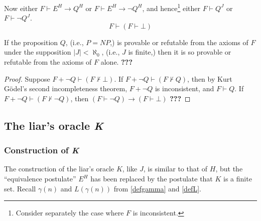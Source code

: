 \documentclass[letterpaper]{article}
\newcommand{\Construction}{{\large\dsmathematical}}
\begin{document}
Now either $F\vdash E^H\longrightarrow Q^H$ or $F\vdash E^H\longrightarrow\lnot Q^H$, and hence\footnote{Consider separately the case where $F$ is inconsistent.} either $F\vdash Q^J$ or $F\vdash\lnot Q^J$.
\begin{equation}
F\vdash(F\vdash\bot)
\end{equation}

\begin{theorem}
	If the proposition $Q$, (i.e., $P=NP$,) is provable or refutable from the axioms of $F$ under the supposition $|J|<\aleph_0$, (i.e., $J$ is finite,) then it is so provable or refutable from the axioms of $F$ alone.	\textbf{\color{red}???}
\end{theorem}
\begin{proof}
Suppose $F+\lnot Q\vdash (F\nvdash\bot)$.  If $F+\lnot Q\vdash (F\nvdash Q)$, then by Kurt G\"odel's second incompleteness theorem, $F+\lnot Q$ is inconsistent, and $F\vdash Q$.  If $F+\lnot Q\vdash (F\nvdash\lnot Q)$, then $(F\vdash\lnot Q)\longrightarrow(F\vdash\bot)$
	\textbf{\color{red}???}
\end{proof}
\subsection{The liar's oracle \textit{K}}
\subsubsection{Construction of \textit{K}}
The construction of the liar's oracle $K$, like $J$, is similar to that of $H$, but the ``equivalence postulate'' $E^H$ has been replaced by the postulate that $K$ is a finite set.
Recall $\gamma(n)$ and $L(\gamma(n))$ from \Construction\Construction \ref{defgamma} and \ref{defL}.
\end{document}
